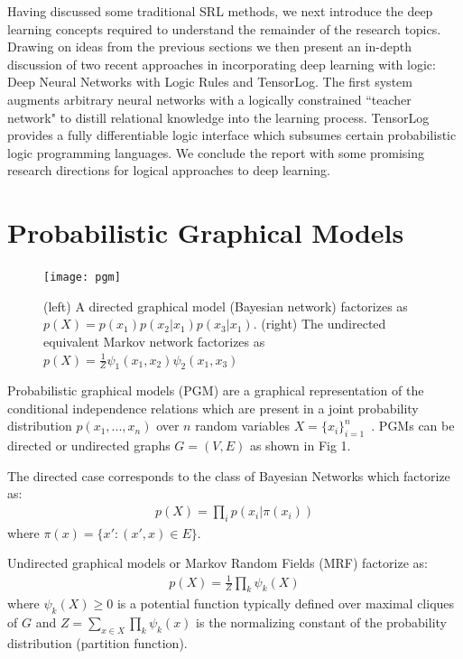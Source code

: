 \documentclass[11pt]{article}
\begin{document}
Having discussed some traditional SRL methods, we next introduce the deep learning concepts required to understand the remainder of the research topics.  Drawing on ideas from the previous sections we then present an in-depth discussion of two recent approaches in incorporating deep learning with logic: Deep Neural Networks with Logic Rules and TensorLog.  The first system augments arbitrary neural networks with a logically constrained ``teacher network" to distill relational knowledge into the learning process.  TensorLog provides a fully differentiable logic interface which subsumes certain probabilistic logic programming languages.  We conclude the report with some promising research directions for logical approaches to deep learning.

\section{Probabilistic Graphical Models}

\begin{figure}
	\begin{center}
		\texttt{[image: pgm]}
	\end{center}
	\caption{(left) A directed graphical model (Bayesian network) factorizes as $p(X) = p(x_1)p(x_2 | x_1)p(x_3|x_1)$.  (right) The undirected equivalent Markov network factorizes as $p(X) = \frac{1}{Z} \psi_1(x_1, x_2) \psi_2(x_1, x_3)$}
\end{figure}

Probabilistic graphical models (PGM) are a graphical representation of the conditional independence relations which are present in a joint probability distribution $p(x_1, ..., x_n)$ over $n$ random variables $X = \{x_i\}_{i = 1}^{n}$~\cite{Prince:2012:CVM:2344089, Russell:2009:AIM:1671238}.  PGMs can be directed or undirected graphs $G = (V, E)$ as shown in Fig 1.  

The directed case corresponds to the class of Bayesian Networks which factorize as:
\begin{gather*}
p(X) = \prod_{i} p(x_i | \pi(x_i))
\end{gather*}
where $\pi(x) = \{ x' : (x', x) \in E \}$.

Undirected graphical models or Markov Random Fields (MRF) factorize as:
\begin{gather*}
p(X) = \frac{1}{Z} \prod_k \psi_k(X)
\end{gather*}
where $\psi_k(X) \geq 0$ is a potential function typically defined over maximal cliques of $G$ and $Z = \sum_{x \in X} \prod_k \psi_k(x)$ is the normalizing constant of the probability distribution (partition function).
\end{document}
